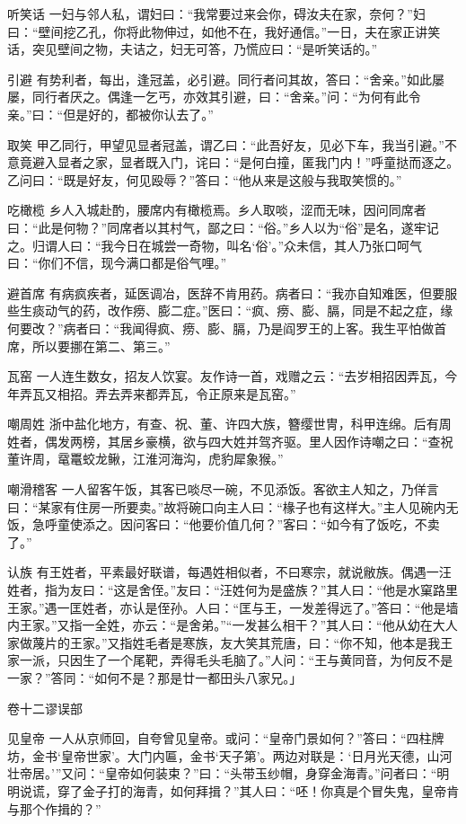 \documentclass[12pt,UTF8]{ctexbook}
\begin{document}
听笑话
一妇与邻人私，谓妇曰：“我常要过来会你，碍汝夫在家，奈何？”妇曰：“壁间挖乙孔，你将此物伸过，如他不在，我好通信。”一日，夫在家正讲笑话，突见壁间之物，夫诘之，妇无可答，乃慌应曰：“是听笑话的。”

引避
有势利者，每出，逢冠盖，必引避。同行者问其故，答曰：“舍亲。”如此屡屡，同行者厌之。偶逢一乞丐，亦效其引避，曰：“舍亲。”问：“为何有此令亲。”曰：“但是好的，都被你认去了。”

取笑
甲乙同行，甲望见显者冠盖，谓乙曰：“此吾好友，见必下车，我当引避。”不意竟避入显者之家，显者既入门，诧曰：“是何白撞，匿我门内！”呼童挞而逐之。乙问曰：“既是好友，何见殴辱？”答曰：“他从来是这般与我取笑惯的。”

吃橄榄
乡人入城赴酌，腰席内有橄榄焉。乡人取啖，涩而无味，因问同席者曰：“此是何物？”同席者以其村气，鄙之曰：“俗。”乡人以为“俗”是名，遂牢记之。归谓人曰：“我今日在城尝一奇物，叫名‘俗’。”众未信，其人乃张口呵气曰：“你们不信，现今满口都是俗气哩。”

避首席
有病疯疾者，延医调冶，医辞不肯用药。病者曰：“我亦自知难医，但要服些生痰动气的药，改作痨、膨二症。”医曰：“疯、痨、膨、膈，同是不起之症，缘何要改？”病者曰：“我闻得疯、痨、膨、膈，乃是阎罗王的上客。我生平怕做首席，所以要挪在第二、第三。”

瓦窑
一人连生数女，招友人饮宴。友作诗一首，戏赠之云：“去岁相招因弄瓦，今年弄瓦又相招。弄去弄来都弄瓦，令正原来是瓦窑。”

嘲周姓
浙中盐化地方，有查、祝、董、许四大族，簪缨世冑，科甲连绵。后有周姓者，偶发两榜，其居乡豪横，欲与四大姓并驾齐驱。里人因作诗嘲之曰：“查祝董许周，鼋鼍蛟龙鳅，江淮河海沟，虎豹犀象猴。”

嘲滑稽客
一人留客午饭，其客已啖尽一碗，不见添饭。客欲主人知之，乃佯言曰：“某家有住房一所要卖。”故将碗口向主人曰：“椽子也有这样大。”主人见碗内无饭，急呼童使添之。因问客曰：“他要价值几何？”客曰：“如今有了饭吃，不卖了。”

认族
有王姓者，平素最好联谱，每遇姓相似者，不曰寒宗，就说敝族。偶遇一汪姓者，指为友曰：“这是舍侄。”友曰：“汪姓何为是盛族？”其人曰：“他是水窠路里王家。”遇一匡姓者，亦认是侄孙。人曰：“匡与王，一发差得远了。”答曰：“他是墙内王家。”又指一全姓，亦云：“是舍弟。”“一发甚么相干？”其人曰：“他从幼在大人家做蔑片的王家。”又指姓毛者是寒族，友大笑其荒唐，曰：“你不知，他本是我王家一派，只因生了一个尾靶，弄得毛头毛脑了。”人问：“王与黄同音，为何反不是一家？”答同：“如何不是？那是廿一都田头八家兄。」

卷十二谬误部

见皇帝
一人从京师回，自夸曾见皇帝。或问：“皇帝门景如何？”答曰：“四柱牌坊，金书‘皇帝世家’。大门内匾，金书‘天子第’。两边对联是：‘日月光天德，山河壮帝居。’”又问：“皇帝如何装束？”曰：“头带玉纱帽，身穿金海青。”问者曰：“明明说谎，穿了金子打的海青，如何拜揖？”其人曰：“呸！你真是个冒失鬼，皇帝肯与那个作揖的？”
\end{document}
